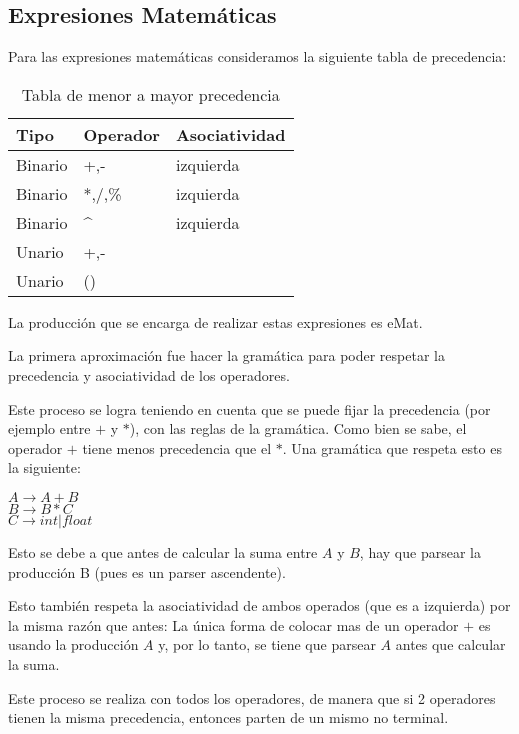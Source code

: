 \subsection{Expresiones Matemáticas}
Para las expresiones matemáticas consideramos la siguiente tabla de precedencia:

\begin{table}[htbp]
\begin{center}
\begin{tabular}{|l|l|l|}
\hline
Tipo & Operador & Asociatividad \\
\hline \hline
Binario & +,- & izquierda \\ \hline
Binario & *,/,\% & izquierda \\ \hline
Binario & \^{} & izquierda \\ \hline
Unario & +,- &  \\ \hline
Unario & () &  \\ \hline

\end{tabular}
\caption{Tabla de menor a mayor precedencia}
\label{Precedencia}
\end{center}
\end{table}

La producción que se encarga de realizar estas expresiones es eMat. 

La primera aproximación fue hacer la gramática para poder respetar la precedencia y asociatividad de los operadores. 

Este proceso se logra teniendo en cuenta que se puede fijar la precedencia (por ejemplo entre $+$ y $*$), con las reglas de la gramática. Como bien se sabe, el operador $+$ tiene menos precedencia que el $*$. Una gramática que respeta esto es la siguiente:

\begin{center}
$A \rightarrow A + B$ \\
$B \rightarrow B * C$ \\
$C \rightarrow int | float$ 
\end{center}
Esto se debe a que antes de calcular la suma entre $A$ y $B$, hay que parsear la producción B (pues es un parser ascendente). 

Esto también respeta la asociatividad de ambos operados (que es a izquierda) por la misma razón que antes: La única forma de colocar mas de un operador $+$ es usando la producción $A$ y, por lo tanto, se tiene que parsear $A$ antes que calcular la suma.

Este proceso se realiza con todos los operadores, de manera que si 2 operadores tienen la misma precedencia, entonces parten de un mismo no terminal.

